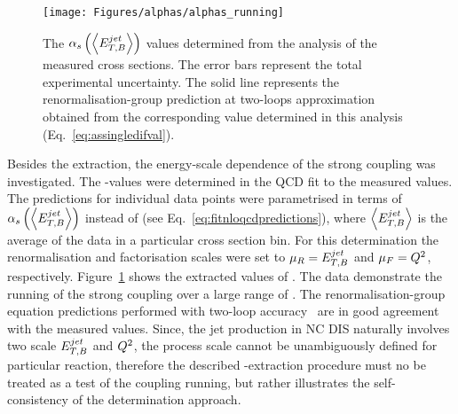 \begin{figure}[t!]
 \centering
 \texttt{[image: Figures/alphas/alphas\_running]}
 \caption{The $\mbox{$\alpha_{s}$}\left(\left<\mbox{$E_{T,B}^{jet}$}\right>\right)$ values determined from the analysis of the measured \dsdetjetb cross sections. The error bars represent the total experimental uncertainty. The solid line represents the renormalisation-group prediction at two-loops approximation obtained from the corresponding \asz value determined in this analysis (Eq.~\eqref{eq:assingledifval}).}
 \label{fig:asrunning}
\end{figure}
Besides the \asz extraction, the energy-scale dependence of the strong coupling was investigated. The \as-values were determined in the QCD fit to the measured \dsdetjetb values. The predictions for individual \dsdetjetb data points were parametrised in terms of $\mbox{$\alpha_{s}$}\left(\left<\mbox{$E_{T,B}^{jet}$}\right>\right)$ instead of \asz (see Eq.~\eqref{eq:fitnloqcdpredictions}), where $\left<\mbox{$E_{T,B}^{jet}$}\right>$ is the average \etjetb of the data in a particular cross section bin. For this determination the renormalisation and factorisation scales were set to $\mu_R=\mbox{$E_{T,B}^{jet}$}$ and $\mu_F=\mbox{${Q^2}$}$, respectively. Figure~\ref{fig:asrunning} shows the extracted values of \as. The data demonstrate the running of the strong coupling over a large range of \etjetb. The renormalisation-group equation predictions performed with two-loop accuracy~\cite{Gross:1973id, Politzer:1973fx, Gross:1973ju, Politzer:1974fr} are in good agreement with the measured values. Since, the jet production in NC DIS naturally involves two scale $\mbox{$E_{T,B}^{jet}$}$ and $\mbox{${Q^2}$}$, the process scale cannot be unambiguously defined for particular reaction, therefore the described \as-extraction procedure must no be treated as a test of the coupling running, but rather illustrates the self-consistency of the \as determination approach.


